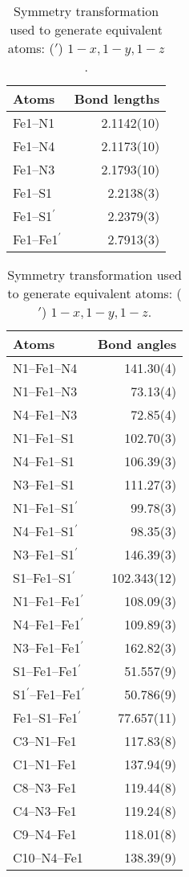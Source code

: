 \documentclass[a4paper]{scrartcl}
\begin{document}
\begin{table}[!ht]
\caption{ Selected bond lengths [\r{A}] for \textbf{mf118b}.}
\begin{tabular}{lD{.}{.}{1.4}}
\hline
\textbf{Atoms} &  \\
\hline
Fe1--N1 & 2.1142(10) \\
Fe1--N4 & 2.1173(10) \\
Fe1--N3 & 2.1793(10) \\
Fe1--S1 & 2.2138(3) \\
Fe1--S1$^{'}$ & 2.2379(3) \\
Fe1--Fe1$^{'}$ & 2.7913(3) \\
\hline
\end{tabular}
\caption*{Symmetry transformation used to generate equivalent atoms: ($'$) $1-x, 1-y, 1-z$.}
\end{table}
\begin{table}[!ht]
\caption{ Selected bond angles [$^{\circ}$] for \textbf{mf118b}.}
\begin{tabular}{lD{.}{.}{1.1}}
\hline
\textbf{Atoms} &  \\
\hline
N1--Fe1--N4 & 141.30(4) \\
N1--Fe1--N3 & 73.13(4) \\
N4--Fe1--N3 & 72.85(4) \\
N1--Fe1--S1 & 102.70(3) \\
N4--Fe1--S1 & 106.39(3) \\
N3--Fe1--S1 & 111.27(3) \\
N1--Fe1--S1$^{'}$ & 99.78(3) \\
N4--Fe1--S1$^{'}$ & 98.35(3) \\
N3--Fe1--S1$^{'}$ & 146.39(3) \\
S1--Fe1--S1$^{'}$ & 102.343(12) \\
N1--Fe1--Fe1$^{'}$ & 108.09(3) \\
N4--Fe1--Fe1$^{'}$ & 109.89(3) \\
N3--Fe1--Fe1$^{'}$ & 162.82(3) \\
S1--Fe1--Fe1$^{'}$ & 51.557(9) \\
S1$^{'}$--Fe1--Fe1$^{'}$ & 50.786(9) \\
Fe1--S1--Fe1$^{'}$ & 77.657(11) \\
C3--N1--Fe1 & 117.83(8) \\
C1--N1--Fe1 & 137.94(9) \\
C8--N3--Fe1 & 119.44(8) \\
C4--N3--Fe1 & 119.24(8) \\
C9--N4--Fe1 & 118.01(8) \\
C10--N4--Fe1 & 138.39(9) \\
\hline
\end{tabular}
\caption*{Symmetry transformation used to generate equivalent atoms: ($'$) $1-x, 1-y, 1-z$.}
\end{table}
\end{document}
